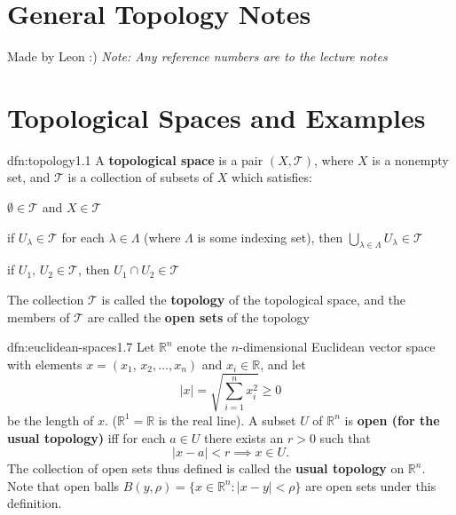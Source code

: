 \documentclass[landscape, 8pt]{extarticle}
\begin{document}
\setlength{\abovedisplayskip}{3.5pt}
\setlength{\belowdisplayskip}{3.5pt}
\setlength{\abovedisplayshortskip}{3.5pt}
\setlength{\belowdisplayshortskip}{3.5pt}

\begin{multicols}{3}
\raggedcolumns


\section*{\huge General Topology Notes}
Made by Leon :) \textit{Note: Any reference numbers are to the lecture notes}

\section{Topological Spaces and Examples}

\begin{dfn}{dfn:topology}{1.1}
    A \textbf{topological space} is a pair $(X, \mathcal{T})$, where $X$ is a nonempty set, and $\mathcal{T}$ is a collection of subsets of $X$ which satisfies:
    \begin{enumerate-a-tight}
        \item $\emptyset \in \mathcal{T}$ and $X \in \mathcal{T}$
        \item if $U_{\lambda}\in \mathcal{T}$ for each $\lambda\in \Lambda$ (where $\Lambda$ is some indexing set), then $\bigcup_{\lambda\in \Lambda} U_{\lambda} \in \mathcal{T}$
        \item if $U_{1},\,U_{2}\in \mathcal{T}$, then $U_{1} \cap U_{2} \in \mathcal{T}$
    \end{enumerate-a-tight}
    The collection $\mathcal{T}$ is called the \textbf{topology} of the topological space, and the members of $\mathcal{T}$ are called the \textbf{open sets} of the topology
\end{dfn}

\begin{xmp}{dfn:euclidean-spaces}{1.7}
    Let $\mathbb{R}^{n}$ enote the $n$-dimensional Euclidean vector space with elements $x = (x_{1},\,x_{2},\dots,x_{n})$ and $x_{i}\in\mathbb{R}$, and let
    \[\lvert x \rvert = \sqrt{\sum_{i = 1}^{n} x_{i}^{2}} \ge 0\]
    be the length of $x$. ($\mathbb{R}^{1} = \mathbb{R}$ is the real line). A subset $U$ of $\mathbb{R}^{n}$ is \textbf{open (for the usual topology)} iff for each $a\in U$ there exists an $r > 0$ such that
    \[\lvert x - a \rvert < r \implies x \in U.\]
    The collection of open sets thus defined is called the \textbf{usual topology} on $\mathbb{R}^{n}$. Note that open balls $B(y, \rho) = \{x\in \mathbb{R}^{n} : \lvert x - y \rvert < \rho\}$ are open sets under this definition.
\end{xmp}



\end{multicols}
\end{document}
